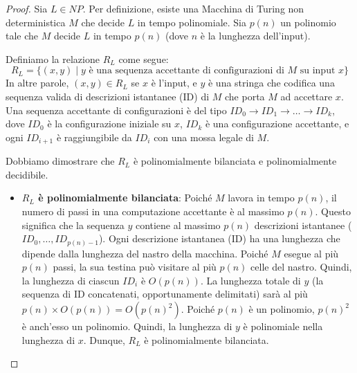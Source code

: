 \documentclass[a4paper]{article}
\theoremstyle{definition} %
\begin{document}
\begin{proof}
Sia $L \in NP$. Per definizione, esiste una Macchina di Turing non deterministica $M$ che decide $L$ in tempo polinomiale. Sia $p(n)$ un polinomio tale che $M$ decide $L$ in tempo $p(n)$ (dove $n$ è la lunghezza dell'input).

Definiamo la relazione $R_L$ come segue:
\[ R_L = \{(x, y) \mid y \text{ è una sequenza accettante di configurazioni di } M \text{ su input } x \} \]
In altre parole, $(x, y) \in R_L$ se $x$ è l'input, e $y$ è una stringa che codifica una sequenza valida di descrizioni istantanee (ID) di $M$ che porta $M$ ad accettare $x$. Una sequenza accettante di configurazioni è del tipo $ID_0 \to ID_1 \to \dots \to ID_k$, dove $ID_0$ è la configurazione iniziale su $x$, $ID_k$ è una configurazione accettante, e ogni $ID_{i+1}$ è raggiungibile da $ID_i$ con una mossa legale di $M$.

Dobbiamo dimostrare che $R_L$ è polinomialmente bilanciata e polinomialmente decidibile.

\begin{itemize}
    \item \textbf{$R_L$ è polinomialmente bilanciata}:
    Poiché $M$ lavora in tempo $p(n)$, il numero di passi in una computazione accettante è al massimo $p(n)$. Questo significa che la sequenza $y$ contiene al massimo $p(n)$ descrizioni istantanee ($ID_0, \dots, ID_{p(n)-1}$).
    Ogni descrizione istantanea (ID) ha una lunghezza che dipende dalla lunghezza del nastro della macchina. Poiché $M$ esegue al più $p(n)$ passi, la sua testina può visitare al più $p(n)$ celle del nastro. Quindi, la lunghezza di ciascun $ID_i$ è $O(p(n))$.
    La lunghezza totale di $y$ (la sequenza di ID concatenati, opportunamente delimitati) sarà al più $p(n) \times O(p(n)) = O(p(n)^2)$. Poiché $p(n)$ è un polinomio, $p(n)^2$ è anch'esso un polinomio. Quindi, la lunghezza di $y$ è polinomiale nella lunghezza di $x$. Dunque, $R_L$ è polinomialmente bilanciata.


\end{itemize}
\end{proof}
\end{document}
